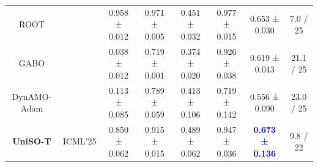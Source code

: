 \begin{table}[t!]
{\begin{tabular}{c|c|ccccc|c}
    ROOT &  & 0.958 ± 0.012 & 0.971 ± 0.005 & 0.451 ± 0.032 & 0.977 ± 0.015 & 0.653 ± 0.030 & 7.0 / 25 \\
    GABO &  & 0.038 ± 0.012 & 0.719 ± 0.001 & 0.374 ± 0.020 & 0.926 ± 0.038 & 0.619 ± 0.043 & 21.1 / 25 \\
    DynAMO-Adam &  & 0.113 ± 0.085 & 0.789 ± 0.059 & 0.413 ± 0.106 & 0.719 ± 0.142 & 0.556 ± 0.090 & 23.0 / 25 \\
    \textbf{UniSO-T} & ICML'25 & 0.850 ± 0.062  & 0.915 ± 0.015 & 0.489 ± 0.062 & 0.947 ± 0.036 &  \textbf{\textcolor{blue}{0.673 ± 0.136}} & 9.8 / 22 \\ 
    \bottomrule
    \end{tabular}}\label{tab:single-offline-bbo}
    \end{table}